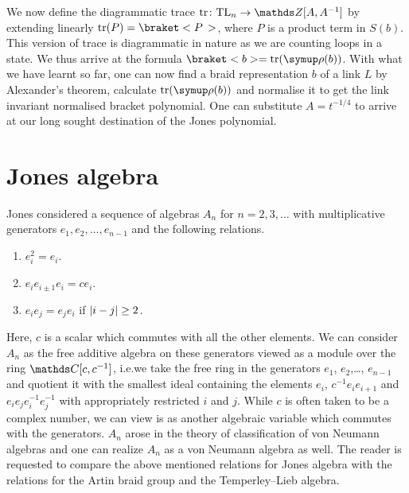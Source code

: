 We now define the diagrammatic trace \(\tr \colon \TL_n \rightarrow \Z[A, A^{-1}]\) by extending linearly \(\tr(P) = \braket<P\,>\), where \(P\) is a product term in \(S(b)\). This version of trace is diagrammatic in nature as we are counting loops in a state. We thus arrive at the formula \(\braket<b> = \tr(\operatorname{\uprho}(b))\). With what we have learnt so far, one can now find a braid representation \(b\) of a link \(L\) by Alexander's theorem, calculate \(\tr(\operatorname{\uprho}(b))\) and normalise it to get the link invariant normalised bracket polynomial. One can substitute \(A = t^{-1/4}\) to arrive at our long sought destination of the Jones polynomial.

\section{Jones algebra}

Jones considered a sequence of algebras \(A_n\) for \(n = 2,3,\ldots\) with multiplicative generators \(e_1, e_2,\ldots, e_{n-1}\) and the following relations.
\begin{enumerate}
    \item \(e_i^2 = e_i\).
	\item \(e_ie_{i\pm 1} e_i = ce_i\).
	\item \(e_ie_j = e_je_i\) if \(\lvert i-j\rvert \geq 2\).
\end{enumerate}
Here, \(c\) is a scalar which commutes with all the other elements. We can consider \(A_n\) as the free additive algebra on these generators viewed as a module over the ring \(\symbb{C}[c,c^{-1}]\), i.e.\@ we take the free ring in the generators \(e_1\), \(e_2\),\ldots, \(e_{n-1}\) and quotient it with the smallest ideal containing the elements \(e_i\), \(c^{-1}e_i e_{i+1}\) and \(e_i e_j e_i^{-1} e_j^{-1}\) with appropriately restricted \(i\) and \(j\). While \(c\) is often taken to be a complex number, we can view is as another algebraic variable which commutes with the generators. \(A_n\) arose in the theory of classification of von Neumann algebras and one can realize \(A_n\) as a von Neumann algebra as well. The reader is requested to compare the above mentioned relations for Jones algebra with the relations for the Artin braid group and the Temperley--Lieb algebra.

